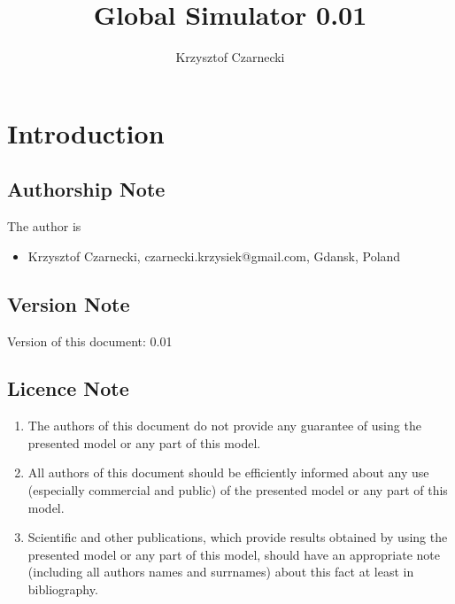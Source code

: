 \documentclass[a4paper,oneside,titlepage]{report}
\begin{document}
\author{Krzysztof Czarnecki}
\title{Global Simulator 0.01}
\thispagestyle{empty}
\maketitle

\newpage
\tableofcontents

\newpage
{}


\chapter{Introduction}
\section{Authorship Note}
The author is
\begin{itemize}
\item Krzysztof Czarnecki, czarnecki.krzysiek@gmail.com, Gdansk, Poland
\end{itemize}
\section{Version Note}

Version of this document: 0.01

\section{Licence Note}
\begin{enumerate}
\item The authors of this document do not provide any guarantee of using the presented model or any part of this model.
\item All authors of this document should be efficiently informed about any use (especially commercial and public) of the presented model or any part of this model.
\item Scientific and other publications, which provide results obtained by using the presented model or any part of this model, should have an appropriate note (including all authors names and surrnames) about this fact at least in bibliography.
\end{enumerate}

\newpage
\end{document}
